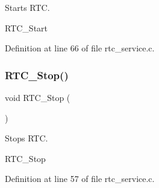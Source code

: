 Starts R\+TC. 

R\+T\+C\+\_\+\+Start 

Definition at line 66 of file rtc\+\_\+service.\+c.

\mbox{\label{group___r_t_c___service_ga1cb35ea7ed16caaaf9f4211c76a371d5}} 
\subsubsection{\texorpdfstring{R\+T\+C\+\_\+\+Stop()}{RTC\_Stop()}}
{\footnotesize\ttfamily void R\+T\+C\+\_\+\+Stop (\begin{DoxyParamCaption}{ }\end{DoxyParamCaption})}



Stops R\+TC. 

R\+T\+C\+\_\+\+Stop 

Definition at line 57 of file rtc\+\_\+service.\+c.

